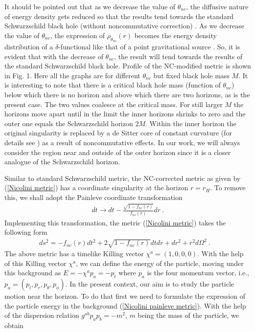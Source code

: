 \documentclass[aps,prd,showpacs,nofootinbib,floats,floatfix,preprintnumbers,groupedaddress,twocolumn]{revtex4-1}
\begin{document}
%
%
%
\par\noindent
It should be  pointed out  that as we decrease the value of $\theta_{nc}$, the diffusive nature of  energy density  gets reduced so that the results tend towards  the standard Schwarzschild black hole (without noncommutative correction) \cite{Dalui:2018qqv}. As we decrease the value of $\theta_{nc}$, the expression of $\rho_{\theta_{nc}}(r)$ becomes the energy density distribution of a $\delta$-functional like that of a point  gravitational source \cite{Nicolini:2008aj}. So, it is evident that with the decrease of $\theta_{nc}$, the result will tend towards the results of the standard Schwarzschild black hole. Profile of the NC-modified metric is shown in Fig. 1. Here all the graphs are for different $\theta_{nc}$ but fixed black hole mass $M$. It is interesting to note that there is a critical black hole mass (function of $\theta_{nc}$) below which there is no horizon and above which there are two horizons, as is the present case. The two values coalesce at the critical mass. For still larger $M$ the horizons move apart until in the limit  the inner horizons shrinks to zero and the outer one equals the Schwarzschild horizon $2M$. Within the inner horizon the original singularity is replaced by  a de Sitter core of constant curvature (for details see \cite{nic,Nicolini:2008aj}) as a result of noncommutative effects. In our work, we will always consider the region near and outside  of the outer horizon since it is a closer analogue of the Schwarzschild horizon. 
\par\noindent
Similar to standard Schwarzschild metric, the NC-corrected metric as given by (\ref{Nicolini metric}) has a coordinate singularity at the horizon $r=r_{H}$. To remove this, we shall adopt the Painleve coordinate transformation \cite{Painleve:1921,Parikh:1999mf}
%
%
%
%
\begin{eqnarray}
dt\rightarrow dt-\frac{\sqrt{1-f_{nc}(r)}}{f_{nc}(r)}dr~.
\end{eqnarray} 
Implementing this  transformation, the metric (\ref{Nicolini metric}) takes the following form
\begin{eqnarray}
ds^{2}=-f_{nc}(r)dt^{2}+2\sqrt{1-f_{nc}(r)}dtdr+dr^{2}+r^{2}d\Omega^{2}~.~~~~\label{Nicolini painleve metric}
\end{eqnarray}
%
%
%
The above metric has a timelike Killing vector $\chi^{a}=(1,0,0,0)$. With the help of this Killing vector $\chi^{a}$, we can define the energy of the particle, moving under this background as $E=-\chi^{a}p_{a}=-p_{t}$ where $p_{a}$ is the four momentum vector, i.e., $p_{a}=(p_{t},p_{r},p_{\theta},p_{\phi})$. In the present context, our aim is to study the particle motion near the horizon. To do that first we need to formulate the expression of the particle energy in the background (\ref{Nicolini painleve metric}). With the help of the dispersion relation $g^{ab}p_{a}p_{b}=-m^{2}$,  $m$ being the mass of the particle, we obtain
\end{document}

